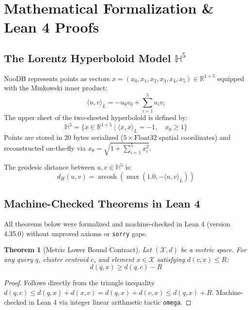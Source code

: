 \documentclass[10pt,twocolumn,a4paper]{article}
\newtheorem{theorem}{Theorem}
\begin{document}
\section{Mathematical Formalization \& Lean 4 Proofs}

\subsection{The Lorentz Hyperboloid Model $\mathbb{H}^5$}
NooDB represents points as vectors $x = (x_0, x_1, x_2, x_3, x_4, x_5) \in \mathbb{R}^{1+5}$ equipped with the Minkowski inner product:
\begin{equation}
\langle u, v \rangle_L = -u_0 v_0 + \sum_{i=1}^5 u_i v_i
\end{equation}
The upper sheet of the two-sheeted hyperboloid is defined by:
\begin{equation}
\mathbb{H}^5 = \{ x \in \mathbb{R}^{1+5} \mid \langle x, x \rangle_L = -1, \quad x_0 \ge 1 \}
\end{equation}
Points are stored in 20 bytes serialized ($5 \times \text{Float32}$ spatial coordinates) and reconstructed on-the-fly via $x_0 = \sqrt{1 + \sum_{i=1}^5 x_i^2}$.

The geodesic distance between $u, v \in \mathbb{H}^5$ is:
\begin{equation}
d_H(u, v) = \operatorname{arcosh}\left( \max\left(1.0, -\langle u, v \rangle_L\right) \right)
\end{equation}

\subsection{Machine-Checked Theorems in Lean 4}
All theorems below were formalized and machine-checked in Lean 4 (version 4.35.0) without unproved axioms or \texttt{sorry} gaps.

\begin{theorem}[Metric Lower Bound Contract]
Let $(\mathcal{X}, d)$ be a metric space. For any query $q$, cluster centroid $c$, and element $x \in \mathcal{X}$ satisfying $d(c, x) \le R$:
\begin{equation}
d(q, x) \ge d(q, c) - R
\end{equation}
\end{theorem}
\begin{proof}
Follows directly from the triangle inequality $d(q, c) \le d(q, x) + d(x, c) = d(q, x) + d(c, x) \le d(q, x) + R$. Machine-checked in Lean 4 via integer linear arithmetic tactic \texttt{omega}.
\end{proof}
\end{document}
